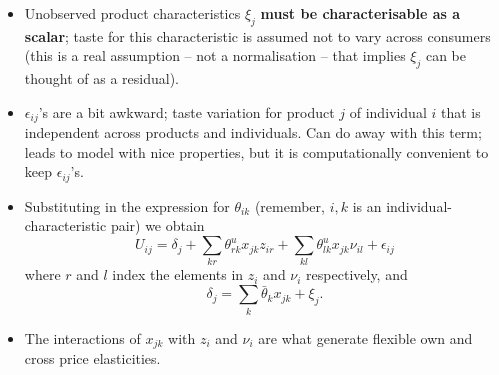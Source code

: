 \documentclass[11pt]{article}
\numberwithin{equation}{section}
\begin{document}
\begin{itemize}
	\item Unobserved product characteristics $\xi_j$ \textbf{must be characterisable as a scalar}; taste for this characteristic is assumed not to vary across consumers (this is a real assumption -- not a normalisation -- that implies $\xi_j$ can be thought of as a residual).
	\item $\epsilon_{ij}$'s are a bit awkward; taste variation for product $j$ of individual $i$ that is independent across products and individuals. Can do away with this term; leads to model with nice properties, but it is computationally convenient to keep $\epsilon_{ij}$'s.
	\item Substituting in the expression for $\theta_{ik}$ (remember, $i,k$ is an individual-characteristic pair) we obtain
	\begin{equation}\label{eqn.paper6}
	U_{ij} = \delta_j + \sum_{kr}\theta_{rk}^u x_{jk} z_{ir} + \sum_{kl}\theta_{lk}^u x_{jk} \nu_{il} + \epsilon_{ij}
	\end{equation}
	where $r$ and $l$ index the elements in $z_{i}$ and $\nu_i$ respectively, and
	\begin{equation}
	\delta_j = \sum_{k}\bar{\theta}_kx_{jk} + \xi_j.
	\end{equation}
	\item The interactions of $x_{jk}$ with $z_{i}$ and $\nu_{i}$ are what generate flexible own and cross price elasticities.
	\end{itemize}
\end{document}
